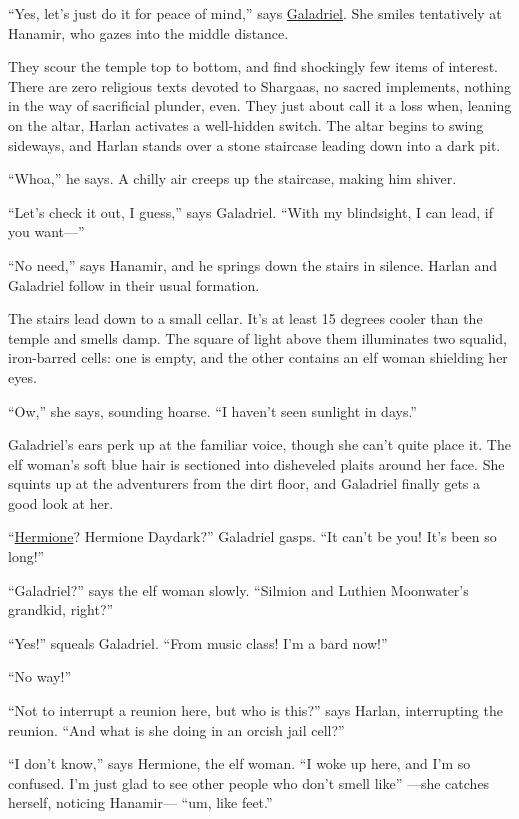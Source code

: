 \documentclass[smalldemyvopaper,11pt,twoside,onecolumn,openright,extrafontsizes]{memoir}
\begin{document}
``Yes, let's just do it for peace of mind,'' says
\href{/characters/galadriel/}{Galadriel}. She smiles tentatively at
Hanamir, who gazes into the middle distance.

They scour the temple top to bottom, and find shockingly few items of
interest. There are zero religious texts devoted to Shargaas, no sacred
implements, nothing in the way of sacrificial plunder, even. They just
about call it a loss when, leaning on the altar, Harlan activates a
well-hidden switch. The altar begins to swing sideways, and Harlan
stands over a stone staircase leading down into a dark pit.

``Whoa,'' he says. A chilly air creeps up the staircase, making him
shiver.

``Let's check it out, I guess,'' says Galadriel. ``With my blindsight, I
can lead, if you want---''

``No need,'' says Hanamir, and he springs down the stairs in silence.
Harlan and Galadriel follow in their usual formation.

The stairs lead down to a small cellar. It's at least 15 degrees cooler
than the temple and smells damp. The square of light above them
illuminates two squalid, iron-barred cells: one is empty, and the other
contains an elf woman shielding her eyes.

``Ow,'' she says, sounding hoarse. ``I haven't seen sunlight in days.''

Galadriel's ears perk up at the familiar voice, though she can't quite
place it. The elf woman's soft blue hair is sectioned into disheveled
plaits around her face. She squints up at the adventurers from the dirt
floor, and Galadriel finally gets a good look at her.

``\href{/characters/hermione/}{Hermione}? Hermione Daydark?'' Galadriel
gasps. ``It can't be you! It's been so long!''

``Galadriel?'' says the elf woman slowly. ``Silmion and Luthien
Moonwater's grandkid, right?''

``Yes!'' squeals Galadriel. ``From music class! I'm a bard now!''

``No way!''

``Not to interrupt a reunion here, but who is this?'' says Harlan,
interrupting the reunion. ``And what is she doing in an orcish jail
cell?''

``I don't know,'' says Hermione, the elf woman. ``I woke up here, and
I'm so confused. I'm just glad to see other people who don't smell
like'' ---she catches herself, noticing Hanamir--- ``um, like feet.''
\end{document}
